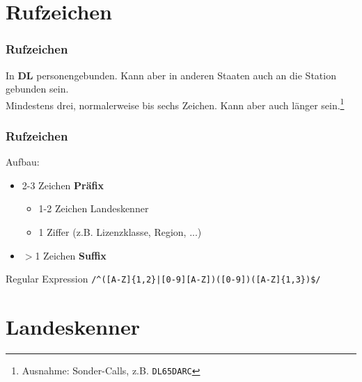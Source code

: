 %
%

\section{Rufzeichen}

\begin{frame}
    \frametitle{Rufzeichen}

    In \textbf{DL} personengebunden. Kann aber in anderen Staaten auch an die Station
    gebunden sein. \\[1em]

    Mindestens drei, normalerweise bis sechs Zeichen. Kann aber auch länger
    sein.\footnote{\scriptsize Ausnahme: Sonder-Calls, z.B.
    \texttt{DL65DARC}}

\end{frame}

\begin{frame}[fragile]
    \frametitle{Rufzeichen}

    Aufbau:

    \begin{itemize}
        \item 2-3 Zeichen \textbf{Präfix}
        \begin{itemize}
            \item 1-2 Zeichen Landeskenner
            \item 1 Ziffer (z.B. Lizenzklasse, Region, ...)
        \end{itemize}
        \item $>$1 Zeichen \textbf{Suffix}
    \end{itemize}

    \pause

    \begin{block}{Regular Expression}
        \verb+/^([A-Z]{1,2}|[0-9][A-Z])([0-9])([A-Z]{1,3})$/+
    \end{block}


\end{frame}

\section{Landeskenner}

